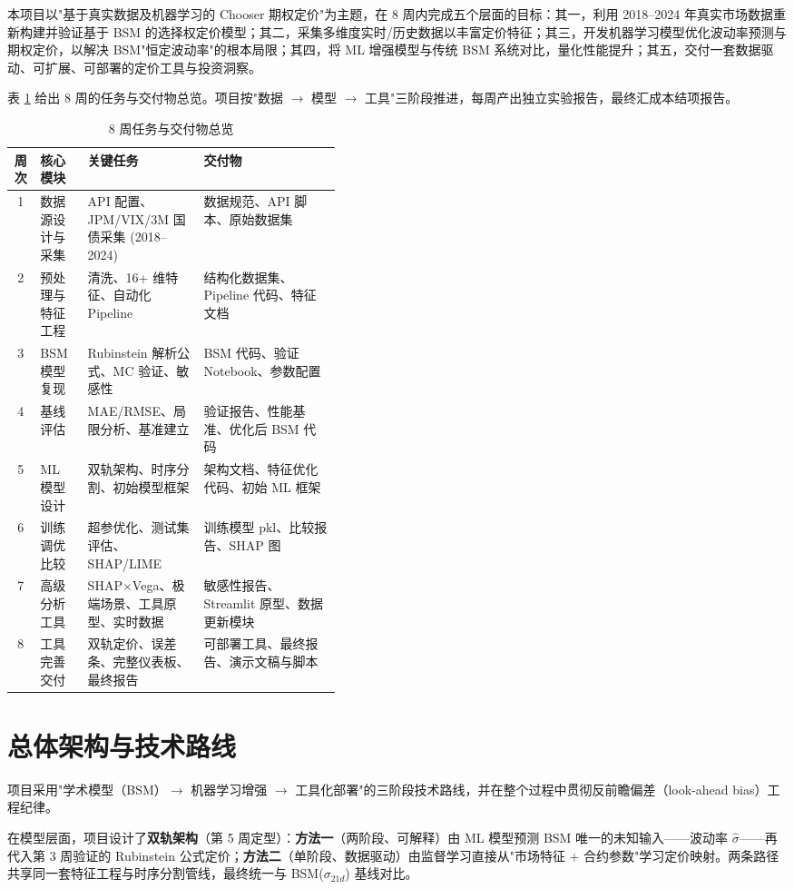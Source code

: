 \documentclass[11pt,a4paper]{article}
\begin{document}
本项目以"基于真实数据及机器学习的 Chooser 期权定价"为主题，在 8 周内完成五个层面的目标：其一，利用 2018--2024 年真实市场数据重新构建并验证基于 BSM 的选择权定价模型；其二，采集多维度实时/历史数据以丰富定价特征；其三，开发机器学习模型优化波动率预测与期权定价，以解决 BSM"恒定波动率"的根本局限；其四，将 ML 增强模型与传统 BSM 系统对比，量化性能提升；其五，交付一套数据驱动、可扩展、可部署的定价工具与投资洞察。

表 \ref{tab:timeline} 给出 8 周的任务与交付物总览。项目按"数据 $\to$ 模型 $\to$ 工具"三阶段推进，每周产出独立实验报告，最终汇成本结项报告。

\begin{table}[H]
\centering
\caption{8 周任务与交付物总览}
\label{tab:timeline}
\begin{tabular}{@{}cllp{0.42\linewidth}@{}}
\toprule
周次 & 核心模块 & 关键任务 & 交付物 \\
\midrule
1 & 数据源设计与采集 & API 配置、JPM/VIX/3M 国债采集 (2018--2024) & 数据规范、API 脚本、原始数据集 \\
2 & 预处理与特征工程 & 清洗、16+ 维特征、自动化 Pipeline & 结构化数据集、Pipeline 代码、特征文档 \\
3 & BSM 模型复现 & Rubinstein 解析公式、MC 验证、敏感性 & BSM 代码、验证 Notebook、参数配置 \\
4 & 基线评估 & MAE/RMSE、局限分析、基准建立 & 验证报告、性能基准、优化后 BSM 代码 \\
5 & ML 模型设计 & 双轨架构、时序分割、初始模型框架 & 架构文档、特征优化代码、初始 ML 框架 \\
6 & 训练调优比较 & 超参优化、测试集评估、SHAP/LIME & 训练模型 pkl、比较报告、SHAP 图 \\
7 & 高级分析工具 & SHAP$\times$Vega、极端场景、工具原型、实时数据 & 敏感性报告、Streamlit 原型、数据更新模块 \\
8 & 工具完善交付 & 双轨定价、误差条、完整仪表板、最终报告 & 可部署工具、最终报告、演示文稿与脚本 \\
\bottomrule
\end{tabular}
\end{table}

\section{总体架构与技术路线}

项目采用"学术模型（BSM）$\to$ 机器学习增强 $\to$ 工具化部署"的三阶段技术路线，并在整个过程中贯彻反前瞻偏差（look-ahead bias）工程纪律。

在模型层面，项目设计了\textbf{双轨架构}（第 5 周定型）：\textbf{方法一}（两阶段、可解释）由 ML 模型预测 BSM 唯一的未知输入——波动率 $\hat\sigma$——再代入第 3 周验证的 Rubinstein 公式定价；\textbf{方法二}（单阶段、数据驱动）由监督学习直接从"市场特征 + 合约参数"学习定价映射。两条路径共享同一套特征工程与时序分割管线，最终统一与 BSM($\sigma_{21d}$) 基线对比。
\end{document}
